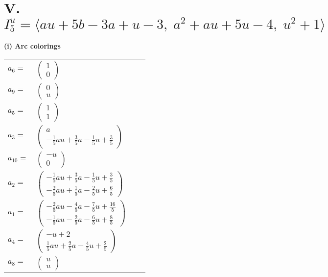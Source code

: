 \documentclass[1p]{elsarticle_modified}
\theoremstyle{definition}
\begin{document}
\centering \section*{V. $I^u_{5}= \langle a u+5 b-3 a+u-3,\;a^2+a u+5 u-4,\;u^2+1 \rangle$}
\flushleft \textbf{(i) Arc colorings}\\
\begin{tabular}{m{7pt} m{180pt} m{7pt} m{180pt} }
\flushright $a_{6}=$&$\begin{pmatrix}1\\0\end{pmatrix}$ \\
\flushright $a_{9}=$&$\begin{pmatrix}0\\u\end{pmatrix}$ \\
\flushright $a_{5}=$&$\begin{pmatrix}1\\1\end{pmatrix}$ \\
\flushright $a_{3}=$&$\begin{pmatrix}a\\-\frac{1}{5} a u+\frac{3}{5} a-\frac{1}{5} u+\frac{3}{5}\end{pmatrix}$ \\
\flushright $a_{10}=$&$\begin{pmatrix}- u\\0\end{pmatrix}$ \\
\flushright $a_{2}=$&$\begin{pmatrix}-\frac{1}{5} a u+\frac{3}{5} a-\frac{1}{5} u+\frac{3}{5}\\-\frac{2}{5} a u+\frac{1}{5} a-\frac{2}{5} u+\frac{6}{5}\end{pmatrix}$ \\
\flushright $a_{1}=$&$\begin{pmatrix}-\frac{2}{5} a u-\frac{4}{5} a-\frac{7}{5} u+\frac{16}{5}\\-\frac{1}{5} a u-\frac{2}{5} a-\frac{6}{5} u+\frac{8}{5}\end{pmatrix}$ \\
\flushright $a_{4}=$&$\begin{pmatrix}- u+2\\\frac{1}{5} a u+\frac{2}{5} a-\frac{4}{5} u+\frac{2}{5}\end{pmatrix}$ \\
\flushright $a_{8}=$&$\begin{pmatrix}u\\u\end{pmatrix}$ \\

\end{tabular}
\end{document}
